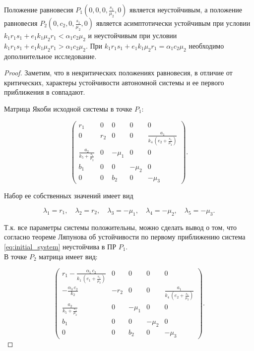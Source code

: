 \documentclass[14pt,a4paper]{extarticle}
\begin{document}
	\begin{theorem}
		Положение равновесия $P_1\left(0,0,0,\frac{s_1}{\mu_2},0\right)$ является неустойчивым, а положение равновесия $P_2\left(0,c_2,0,\frac{s_1}{\mu_2},0\right)$ является асимптотически устойчивым при условии $k_1r_1s_1 + e_1k_1\mu_2r_1< \alpha_1c_2\mu_2$ и неустойчивым при условии $k_1r_1s_1 + e_1k_1\mu_2r_1>\alpha_1c_2\mu_2$. При $k_1r_1s_1 + e_1k_1\mu_2r_1 = \alpha_1c_2\mu_2$ необходимо дополнительное исследование.
	\end{theorem}
	\begin{proof}
		Заметим, что в некритических положениях равновесия, в отличие от критических, характеры устойчивости автономной системы и ее первого приближения в совпадают.
		
		Матрица Якоби исходной системы в точке $P_1$:
		
		\[\begin{pmatrix}
			r_{1} & 0 & 0 & 0 & 0\\ 
			0 & r_{2} & 0 & 0 & \frac{a_{1}}{k_{4}\,\left(e_{2}+\frac{s_{1}}{\mu _{2}}\right)}\\ 
			\frac{a_{2}}{k_{5}+\frac{s_{1}}{\mu _{2}}} & 0 & -\mu _{1} & 0 & 0\\ 
			b_{1} & 0 & 0 & -\mu _{2} & 0\\ 
			0 & 0 & b_{2} & 0 & -\mu _{3} 
		\end{pmatrix}.\]
		
		Набор ее собственных значений имеет вид
		
		\[\lambda_1=r_1,\quad \lambda_2=r_2,\quad \lambda_3=-\mu_1,\quad \lambda_4=-\mu_2,\quad \lambda_5=-\mu_3.\]
		
		Т.к. все параметры системы положительны, можно сделать вывод о том, что согласно теореме Ляпунова об устойчивости по первому приближению система \ref{eq:initial_system} неустойчива в ПР $P_1$.\\
		В точке $P_2$ матрица имеет вид:
		
		\[\begin{pmatrix}
			r_{1}-\frac{\alpha _{1}\,c_{2}}{k_{1}\,\left(e_{1}+\frac{s_{1}}{\mu _{2}}\right)} & 0 & 0 & 0 & 0\\ 
			-\frac{\alpha _{3}\,c_{2}}{k_{2}} & -r_{2} & 0 & 0 & \frac{a_{1}}{k_{4}\,\left(e_{2}+\frac{s_{1}}{\mu _{2}}\right)}\\ 
			\frac{a_{2}}{k_{5}+\frac{s_{1}}{\mu _{2}}} & 0 & -\mu _{1} & 0 & 0\\ 
			b_{1} & 0 & 0 & -\mu _{2} & 0\\ 
			0 & 0 & b_{2} & 0 & -\mu _{3}
		\end{pmatrix}.\]
		

\end{proof}
\end{document}
